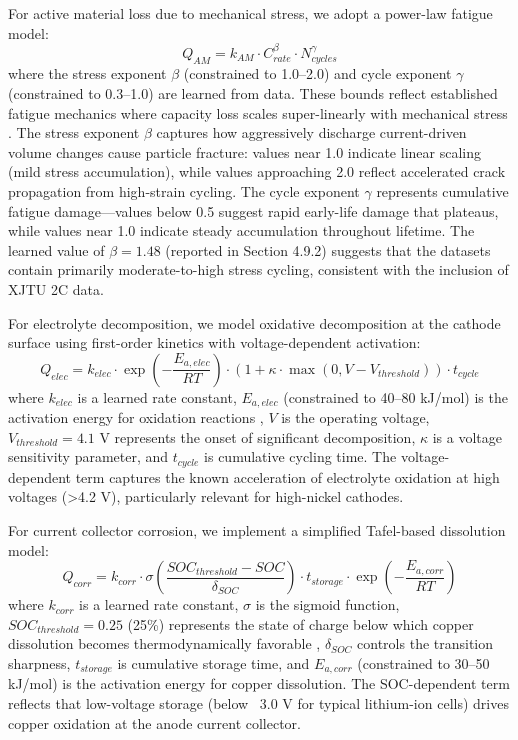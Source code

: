\documentclass[5p,times,authoryear]{elsarticle}
\begin{document}
For active material loss due to mechanical stress, we adopt a power-law fatigue model:
\begin{equation}
Q_{AM} = k_{AM} \cdot C_{rate}^\beta \cdot N_{cycles}^\gamma
\label{eq:am_physics}
\end{equation}
where the stress exponent $\beta$ (constrained to 1.0--2.0) and cycle exponent $\gamma$ (constrained to 0.3--1.0) are learned from data. These bounds reflect established fatigue mechanics where capacity loss scales super-linearly with mechanical stress \citep{zhang2020degradation}. The stress exponent $\beta$ captures how aggressively discharge current-driven volume changes cause particle fracture: values near 1.0 indicate linear scaling (mild stress accumulation), while values approaching 2.0 reflect accelerated crack propagation from high-strain cycling. The cycle exponent $\gamma$ represents cumulative fatigue damage—values below 0.5 suggest rapid early-life damage that plateaus, while values near 1.0 indicate steady accumulation throughout lifetime. The learned value of $\beta = 1.48$ (reported in Section 4.9.2) suggests that the datasets contain primarily moderate-to-high stress cycling, consistent with the inclusion of XJTU 2C data.

For electrolyte decomposition, we model oxidative decomposition at the cathode surface using first-order kinetics with voltage-dependent activation:
\begin{equation}
Q_{elec} = k_{elec} \cdot \exp\left(-\frac{E_{a,elec}}{RT}\right) \cdot \left(1 + \kappa \cdot \max(0, V - V_{threshold})\right) \cdot t_{cycle}
\label{eq:electrolyte_physics}
\end{equation}
where $k_{elec}$ is a learned rate constant, $E_{a,elec}$ (constrained to 40--80 kJ/mol) is the activation energy for oxidation reactions \citep{vetter2005ageing}, $V$ is the operating voltage, $V_{threshold} = 4.1$ V represents the onset of significant decomposition, $\kappa$ is a voltage sensitivity parameter, and $t_{cycle}$ is cumulative cycling time. The voltage-dependent term captures the known acceleration of electrolyte oxidation at high voltages (>4.2 V), particularly relevant for high-nickel cathodes.

For current collector corrosion, we implement a simplified Tafel-based dissolution model:
\begin{equation}
Q_{corr} = k_{corr} \cdot \sigma\left(\frac{SOC_{threshold} - SOC}{\delta_{SOC}}\right) \cdot t_{storage} \cdot \exp\left(-\frac{E_{a,corr}}{RT}\right)
\label{eq:corrosion_physics}
\end{equation}
where $k_{corr}$ is a learned rate constant, $\sigma$ is the sigmoid function, $SOC_{threshold} = 0.25$ (25\%) represents the state of charge below which copper dissolution becomes thermodynamically favorable \citep{schmalstieg2014electrochemical}, $\delta_{SOC}$ controls the transition sharpness, $t_{storage}$ is cumulative storage time, and $E_{a,corr}$ (constrained to 30--50 kJ/mol) is the activation energy for copper dissolution. The SOC-dependent term reflects that low-voltage storage (below ~3.0 V for typical lithium-ion cells) drives copper oxidation at the anode current collector.
\end{document}
